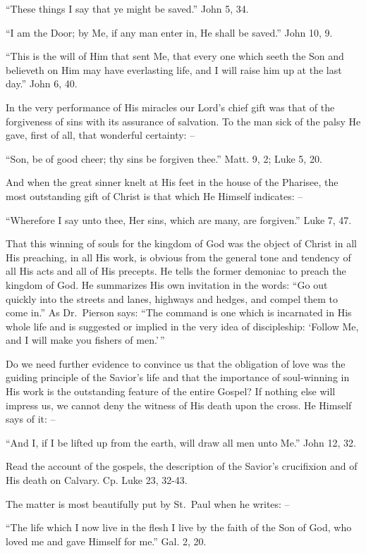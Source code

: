 \documentclass[
]{book}
\begin{document}
``These things I say that ye might be saved.'' John 5, 34.

``I am the Door; by Me, if any man enter in, He shall be saved.'' John 10, 9.

``This is the will of Him that sent Me, that every one which seeth the Son and believeth on Him may have everlasting life, and I will raise him up at the last day.'' John 6, 40.

In the very performance of His miracles our Lord's chief gift was that of the forgiveness of sins with its assurance of salvation. To the man sick of the palsy He gave, first of all, that wonderful certainty: --

``Son, be of good cheer; thy sins be forgiven thee.'' Matt. 9, 2; Luke 5, 20.

And when the great sinner knelt at His feet in the house of the Pharisee, the most outstanding gift of Christ is that which He Himself indicates: --

``Wherefore I say unto thee, Her sins, which are many, are forgiven.'' Luke 7, 47.

That this winning of souls for the kingdom of God was the object of Christ in all His preaching, in all His work, is obvious from the general tone and tendency of all His acts and all of His precepts. He tells the former demoniac to preach the kingdom of God. He summarizes His own invitation in the words: ``Go out quickly into the streets and lanes, highways and hedges, and compel them to come in.'' As Dr.~Pierson says: ``The command is one which is incarnated in His whole life and is suggested or implied in the very idea of discipleship: `Follow Me, and I will make you fishers of men.'\,''

Do we need further evidence to convince us that the obligation of love was the guiding principle of the Savior's life and that the importance of soul-winning in His work is the outstanding feature of the entire Gospel? If nothing else will impress us, we cannot deny the witness of His death upon the cross. He Himself says of it: --

``And I, if I be lifted up from the earth, will draw all men unto Me.'' John 12, 32.

Read the account of the gospels, the description of the Savior's crucifixion and of His death on Calvary. Cp. Luke 23, 32-43.

The matter is most beautifully put by St.~Paul when he writes: --

``The life which I now live in the flesh I live by the faith of the Son of God, who loved me and gave Himself for me.'' Gal. 2, 20.
\end{document}
